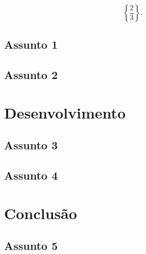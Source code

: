 \documentclass[12pt, a4paper, oneside]{book}
\begin{document}
\begin{equation}
\left\lbrace \frac{2}{3}\right\rbrace .
\end{equation}

\section{Assunto 1}
\section{Assunto 2}
\chapter{Desenvolvimento}
\section{Assunto 3}
\section{Assunto 4}
\chapter{Conclusão}
\section{Assunto 5}
\end{document}
